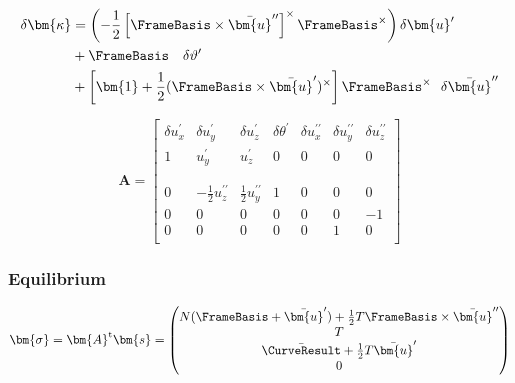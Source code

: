 $$
\begin{aligned}
\delta\bm{\kappa} &= 
\left(-\frac{1}{2}\left[\FrameBasis \times\bar{\bm{u}}^{\prime\prime}\right]^{\times}\FrameBasis^{\times}\right)  \delta \bm{u}^{\prime} \\
&+ \FrameBasis  ~~~ \delta \vartheta^{\prime} \\
&+\left[\bm{1} + \frac{1}{2}(\FrameBasis \times\bar{\bm{u}}^{\prime})^\times \right]\FrameBasis^{\times} ~~ \delta \bar{\bm{u}}^{\prime\prime} \\
\end{aligned}
$$


$$
\bm{A} = 
\left[
\begin{array}{ccc|c|ccc}
\delta u_x^{\prime} &             \delta u_y^{\prime} &            \delta u_z^{\prime} & \delta \theta^{\prime} & \delta u_x^{\prime\prime} & \delta u_y^{\prime\prime} & \delta u_z^{\prime\prime} \\ 
\hline
        1 &                    u_y^{\prime} &                   u_z^{\prime} & 0 &             0 &                        0 &                         0                    \\
\\
\\
        0 & -\frac{1}{2} u_z^{\prime\prime} & \frac{1}{2} u_y^{\prime\prime} & 1 &             0 & 0 &      0      \\ \hline
        0 &                               0 &                              0 & 0 &             0 &                   0 &       -1 \\
        0 &                               0 &                              0 & 0 &             0 &        1  &                    0 \\
\end{array}
\right]
$$

\subsubsection{Equilibrium}

\[
\bm{\sigma} = \bm{A}^{\mathrm{t}} \bm{s} = \begin{pmatrix}
N (\FrameBasis  + \bar{\bm{u}}') + \frac{1}{2} T \FrameBasis  \times \bar{\bm{u}}'' \\
T \\ 
\bar{\CurveResult} + \frac{1}{2} T \bar{\bm{u}}' \\
 0
\end{pmatrix}
\]

